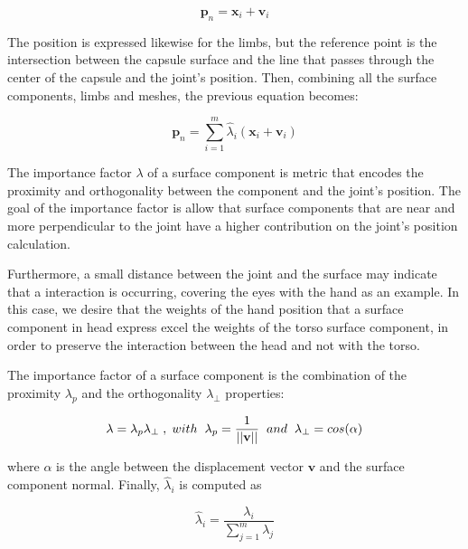\documentclass{vgtc}
\begin{document}
\begin{equation}
\label{eq:egocoord_jointpos1}
\mathbf{p}_n = \mathbf{x}_i + \mathbf{v}_i
\end{equation}

The position is expressed likewise for the limbs, but the reference
point is the intersection between the capsule surface and the line that
passes through the center of the capsule and the joint's position. Then,
combining all the surface components, limbs and meshes, the previous
equation becomes:

\begin{equation}
\label{eq:egocoord_jointpos2}
\mathbf{p}_n = \sum_{i=1}^{m}\hat{\lambda}_{i}(\mathbf{x}_i + \mathbf{v}_i)
\end{equation}

The importance factor \(\lambda\) of a surface component is metric that
encodes the proximity and orthogonality between the component and the
joint's position. The goal of the importance factor is allow that
surface components that are near and more perpendicular to the joint
have a higher contribution on the joint's position calculation.

Furthermore, a small distance between the joint and the surface may
indicate that a interaction is occurring, covering the eyes with the
hand as an example. In this case, we desire that the weights of the hand
position that a surface component in head express excel the weights of
the torso surface component, in order to preserve the interaction
between the head and not with the torso.

The importance factor of a surface component is the combination of the
proximity \(\lambda_p\) and the orthogonality \(\lambda_{\perp}\)
properties:

\begin{equation}
\label{eq:importance}
\lambda = \lambda_p \lambda_{\perp}\hspace{0.1cm},\hspace{0.1cm} with \hspace{0.2cm}\lambda_p =  \frac{1}{||\mathbf{v}||}\hspace{0.2cm} and \hspace{0.2cm}\lambda_{\perp} = cos(\alpha)
\end{equation}

where \(\alpha\) is the angle between the displacement vector
\(\mathbf{v}\) and the surface component normal. Finally,
\(\hat{\lambda}_{i}\) is computed as

\begin{equation}
\label{eq:importance_ortho}
\hat{\lambda}_{i} = \frac{\lambda_{i}}{\sum_{j=1}^{m}\lambda_{j}}
\end{equation}
\end{document}
